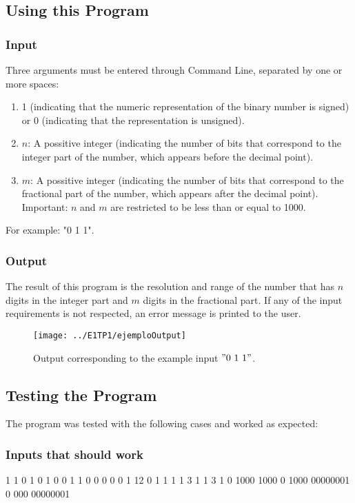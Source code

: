 \subsection{\color{purple}Using this Program}
\subsubsection{\color{orange}Input}
Three arguments must be entered through Command Line, separated by one or more spaces:
\begin{enumerate}
\item  1 (indicating that the numeric representation of the binary number is signed) or 0 (indicating that the representation is unsigned).
\item $n$: A possitive integer (indicating the number of bits that correspond to the integer part of the number, which appears before the decimal point).
\item  $m$: A possitive integer (indicating the number of bits that correspond to the fractional part of the number, which appears after the decimal point).
Important: $n$ and $m$ are restricted to be less than or equal to 1000.
\end{enumerate}
{\color{cyan}For example: "0 1 1"}.

\subsubsection{\color{orange}Output}
The result of this program is the resolution and range of the number that has $n$ digits in the integer part and $m$ digits in the fractional part. If any of the input requirements is not respected, an error message is printed to the user.

\begin{figure}[h!]
\centering
\texttt{[image: ../E1TP1/ejemploOutput]}
\caption{\color{cyan}Output corresponding to the example input $"0\ 1\ 1"$.}
\label{image output}
\end{figure}

\subsection{\color{purple}Testing the Program}
The program was tested with the following cases and worked as expected:
\subsubsection{\color{orange}Inputs that should work}
1 1 0
1 0 1
0 0 1
1 0 0 
0 0 0 
1 12 0
1 1    1
1 3          1
1          3     1
0 1000 1000
0 1000 00000001
0 000 00000001
